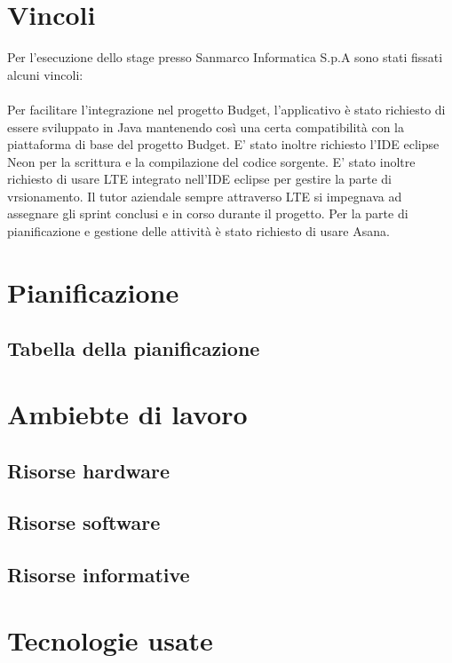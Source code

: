 \section{Vincoli}
Per l'esecuzione dello stage presso Sanmarco Informatica S.p.A sono stati fissati alcuni vincoli: \\\\

Per facilitare l'integrazione nel progetto Budget, l'applicativo è stato richiesto di essere sviluppato in Java mantenendo così una certa compatibilità con la piattaforma di base del progetto Budget. 
E' stato inoltre richiesto l'IDE eclipse Neon per la scrittura e la compilazione del codice sorgente. E' stato inoltre richiesto di usare LTE integrato nell'IDE eclipse per gestire la parte di vrsionamento. Il tutor aziendale sempre attraverso LTE si impegnava ad assegnare gli sprint conclusi e in corso durante il progetto. Per la parte di pianificazione e gestione delle attività è stato richiesto di usare Asana.  \\

\section{Pianificazione}




\subsection{Tabella della pianificazione}

\section{Ambiebte di lavoro}
\subsection{Risorse hardware}
\subsection{Risorse software}
\subsection{Risorse informative}

\section{Tecnologie usate}